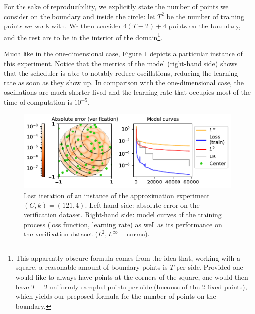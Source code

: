 \documentclass[12pt]{report} %
\begin{document}
For the sake of reproducibility, we explicitly state the number of points we consider on the boundary and inside the circle: let $T^2$ be the number of training points we work with. We then consider $4 (T - 2) + 4$ points on the boundary, and the rest are to be in the interior of the domain\footnote{This apparently obscure formula comes from the idea that, working with a square, a reasonable amount of boundary points is $T$ per side. Provided one would like to always have points at the corners of the square, one would then have $T-2$ uniformly sampled points per side (because of the $2$ fixed points), which yields our proposed formula for the number of points on the boundary.}.

Much like in the one-dimensional case, Figure \ref{fig:parabola-example-training-TR22-C121} depicts a particular instance of this experiment. Notice that the metrics of the model (right-hand side) shows that the scheduler is able to notably reduce oscillations, reducing the learning rate as soon as they show up. In comparison with the one-dimensional case, the oscillations are much shorter-lived and the learning rate that occupies most of the time of computation is $10^{-5}$.

\begin{figure}[h]
  \includegraphics[width=\textwidth]{imagenes/experiments/2d/statistical_2d_full_scheduler_interpolation/parabola/parabola-TR22-C121-Kgaussian_kernel-Sh2.5635-5-E57813.pdf}
  \caption{Last iteration of an instance of the approximation experiment $(C,k)=(121,4)$. Left-hand side: absolute error on the verification dataset. Right-hand side: model curves of the training process (loss function, learning rate) as well as its performance on the verification dataset ($L^2, L^\infty-$norms).}
  \label{fig:parabola-example-training-TR22-C121}
\end{figure}
\end{document}
